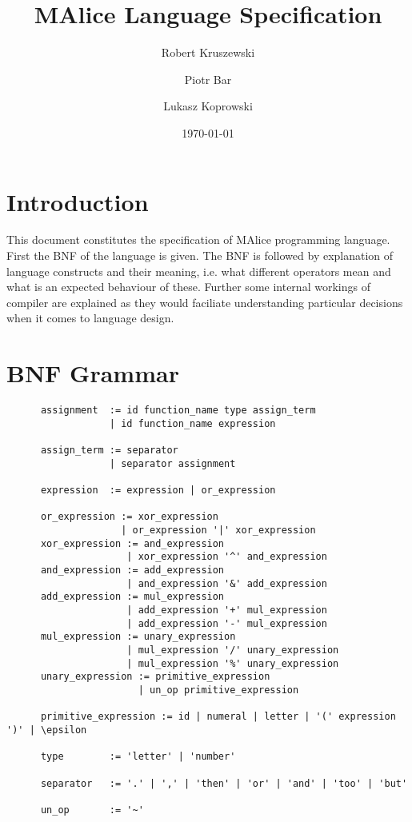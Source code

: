 \documentclass[a4wide, 11pt]{article}
\begin{document}
\title{MAlice Language Specification}

\author{Robert Kruszewski \and Piotr Bar \and Lukasz Koprowski}


\date{\today}         %

\maketitle            %

\section{Introduction}

This document constitutes the specification of MAlice programming language.
First the BNF of the language is given. The BNF is followed by explanation
of language constructs and their meaning, i.e. what different operators mean
and what is an expected behaviour of these. Further some internal workings of compiler
are explained as they would faciliate understanding particular decisions when
it comes to language design.

\section{BNF Grammar} 

\begin{verbatim}
      assignment  := id function_name type assign_term
                  | id function_name expression 

      assign_term := separator
                  | separator assignment

      expression  := expression | or_expression

      or_expression := xor_expression
                    | or_expression '|' xor_expression
      xor_expression := and_expression
                     | xor_expression '^' and_expression 
      and_expression := add_expression
                     | and_expression '&' add_expression
      add_expression := mul_expression
                     | add_expression '+' mul_expression
                     | add_expression '-' mul_expression
      mul_expression := unary_expression
                     | mul_expression '/' unary_expression
                     | mul_expression '%' unary_expression
      unary_expression := primitive_expression
                       | un_op primitive_expression

      primitive_expression := id | numeral | letter | '(' expression ')' | \epsilon

      type        := 'letter' | 'number'

      separator   := '.' | ',' | 'then' | 'or' | 'and' | 'too' | 'but'

      un_op       := '~'
\end{verbatim}
\end{document}
